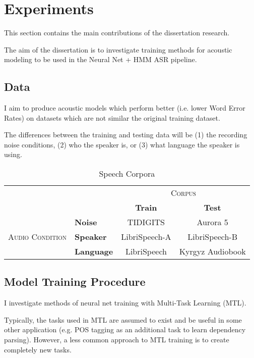 \documentclass[10pt,a4paper]{article}
\begin{document}
\section{Experiments}

This section contains the main contributions of the dissertation research.

The aim of the dissertation is to investigate training methods for acoustic modeling to be used in the Neural Net + HMM ASR pipeline.

\subsection{Data}
I aim to produce acoustic models which perform better (i.e. lower Word Error Rates) on datasets which are not similar the original training dataset.

The differences between the training and testing data will be (1) the recording noise conditions, (2) who the speaker is, or (3) what language the speaker is using.


\begin{table}[htbp]
  \centering
  \begin{adjustbox}{width=.75\textwidth}
    \begin{tabular}{clcc}
      \toprule
      && \multicolumn{2}{c}{\textsc{Corpus}}\\
      && \textbf{Train} & \textbf{Test}\\
      \midrule
      \multirow{3}{*}{\textsc{Audio Condition}} &\textbf{Noise} & TIDIGITS & Aurora 5 \\
      &\textbf{Speaker} & LibriSpeech-A & LibriSpeech-B \\
      &\textbf{Language} & LibriSpeech & Kyrgyz Audiobook \\
      \bottomrule
    \end{tabular}
    \label{table:data}
  \end{adjustbox}
  
  \caption{Speech Corpora}
  
\end{table}


\subsection{Model Training Procedure}

I investigate methods of neural net training with Multi-Task Learning (MTL).

Typically, the tasks used in MTL are assumed to exist and be useful in some other application (e.g. POS tagging as an additional task to learn dependency parsing). However, a less common approach to MTL training is to create completely new tasks.
\end{document}
